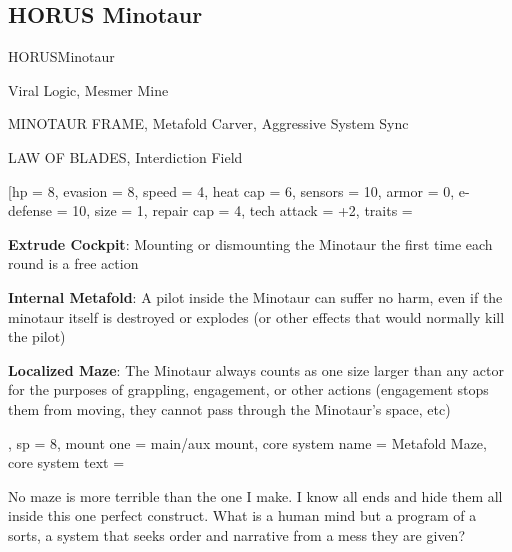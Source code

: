\subsection{HORUS Minotaur}

\begin{mech}{HORUS}{Minotaur}


\begin{license}
\item Viral Logic, Mesmer Mine
\item MINOTAUR FRAME, Metafold Carver, Aggressive System Sync
\item LAW OF BLADES, Interdiction Field
\end{license}


\frameBox
[hp = 8,
evasion = 8,
speed = 4,
heat cap = 6,
sensors = 10,
armor = 0,
e-defense = 10,
size = 1,
repair cap = 4,
tech attack = +2,
traits = {
      \textbf{Extrude Cockpit}: Mounting or dismounting the Minotaur the first time each round is a free action

      \textbf{Internal Metafold}: A pilot inside the Minotaur can suffer no harm, even if the minotaur itself is destroyed or explodes (or other effects that would normally kill the pilot)

      \textbf{Localized Maze}: The Minotaur always counts as one size larger than any actor for the purposes of grappling, engagement, or other actions (engagement stops them from moving, they cannot pass through the Minotaur's space, etc)
      },
sp = 8,
mount one = main/aux mount,
core system name = Metafold Maze,
core system text = {No maze is more terrible than the one I make. I know all ends and hide them all inside this one perfect construct. What is a human mind but a program of a sorts, a system that seeks order and narrative from a mess they are given?

}
\end{mech}
